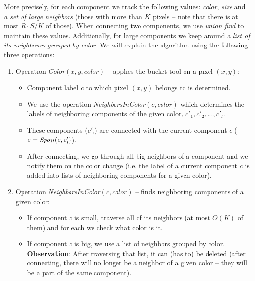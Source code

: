 More precisely, for each component we track the following values:
\textit{color}, \textit{size} and \textit{a set of large neighbors} (those with
more than $K$ pixels -- note that there is at most $R \cdot S / K$ of those).
When connecting two components, we use \textit{union find} to maintain these
values. Additionally, for large components we keep around a \textit{list of its
neighbours grouped by color}. We will explain the algorithm using the following
three operations:
\begin{enumerate}
  \item Operation \textit{Color}$(x, y, color)$ -- applies the bucket tool on a
    pixel $(x, y)$:
    \begin{itemize}[topsep=0pt]
      \item Component label $c$ to which pixel $(x, y)$ belongs to is determined.
      \item We use the operation \textit{NeighborsInColor}$(c, color)$ which determines
        the labels of neighboring components of the given color, $c'_1, c'_2, ..., c'_l$.
      \item These components ($c'_i$) are connected with the current component $c$
        ($c = \textrm{\textit{Spoji}}(c, c'_i)$).
      \item After connecting, we go through all big neighbors of a component
            and we notify them on the color change (i.e. the label of a current
            component $c$ is added into lists of neighboring components for a given
            color).
    \end{itemize}

  \item Operation \textit{NeighborsInColor}$(c, color)$ -- finds neighboring
    components of a given color:
    \begin{itemize}[topsep=0pt]
      \item If component $c$ is small, traverse all of its neighbors (at most
            $O(K)$ of them) and for each we check what color is it.
      \item If component $c$ is big, we use a list of neighbors grouped by color.\\
        \textbf{Observation}: After traversing that list, it can (has to) be deleted
        (after connecting, there will no longer be a neighbor of a given color --
        they will be a part of the same component).
    \end{itemize}


\end{enumerate}
